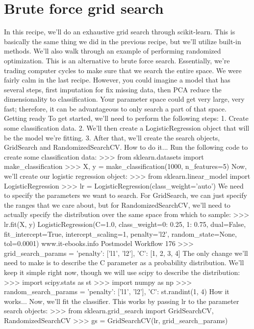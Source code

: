 \section{Brute force grid search}
In this recipe, we'll do an exhaustive grid search through scikit-learn. This is basically the same
thing we did in the previous recipe, but we'll utilize built-in methods.
We'll also walk through an example of performing randomized optimization. This is an alternative
to brute force search. Essentially, we're trading computer cycles to make sure that we search
the entire space. We were fairly calm in the last recipe. However, you could imagine a model
that has several steps, first imputation for fix missing data, then PCA reduce the dimensionality
to classification. Your parameter space could get very large, very fast; therefore, it can be
advantageous to only search a part of that space.
Getting ready
To get started, we'll need to perform the following steps:
1. Create some classification data.
2. We'll then create a LogisticRegression object that will be the model we're fitting.
3. After that, we'll create the search objects, GridSearch and RandomizedSearchCV.
How to do it...
Run the following code to create some classification data:
>>> from sklearn.datasets import make_classification
>>> X, y = make_classification(1000, n_features=5)
Now, we'll create our logistic regression object:
>>> from sklearn.linear_model import LogisticRegression
>>> lr = LogisticRegression(class_weight='auto')
We need to specify the parameters we want to search. For GridSearch, we can just specify
the ranges that we care about, but for RandomizedSearchCV, we'll need to actually specify
the distribution over the same space from which to sample:
>>> lr.fit(X, y)
LogisticRegression(C=1.0, class_weight={0: 0.25, 1: 0.75}, dual=False,
fit_intercept=True, intercept_scaling=1,
penalty='l2', random_state=None, tol=0.0001)
www.it-ebooks.info
Postmodel Workflow
176
>>> grid_search_params = {'penalty': ['l1', 'l2'],
'C': [1, 2, 3, 4]}
The only change we'll need to make is to describe the C parameter as a probability distribution.
We'll keep it simple right now, though we will use scipy to describe the distribution:
>>> import scipy.stats as st
>>> import numpy as np
>>> random_search_params = {'penalty': ['l1', 'l2'],
'C': st.randint(1, 4)}
How it works...
Now, we'll fit the classifier. This works by passing lr to the parameter search objects:
>>> from sklearn.grid_search import GridSearchCV, RandomizedSearchCV
>>> gs = GridSearchCV(lr, grid_search_params)
